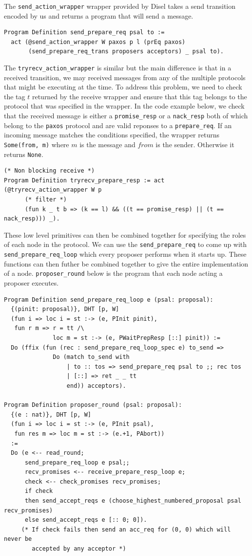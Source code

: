 The \texttt{send\_action\_wrapper} wrapper provided by Disel takes a send transition encoded
by us and returns a program that will send a message.
\begin{lstlisting}
Program Definition send_prepare_req psal to :=
  act (@send_action_wrapper W paxos p l (prEq paxos)
       (send_prepare_req_trans proposers acceptors) _ psal to).
\end{lstlisting}

The \texttt{tryrecv\_action\_wrapper} is similar but the main difference is that in
a received transition, we may received messages from any of the multiple protocols
that might be executing at the time. To address this problem, we need to check the
tag $t$ returned by the receive wrapper and ensure that this tag belongs to the
protocol that was specified in the wrapper. In the code example below, we check
that the received message is either a \texttt{promise\_resp} or a \texttt{nack\_resp}
both of which belong to the \texttt{paxos} protocol and are valid reponses to a
\texttt{prepare\_req}.
If an incoming message matches the conditions specified, the wrapper returns
\texttt{Some(from, m)} where $m$ is the message and $from$ is the sender. Otherwise
it returns \texttt{None}.

\begin{lstlisting}
(* Non blocking receive *)
Program Definition tryrecv_prepare_resp := act (@tryrecv_action_wrapper W p
      (* filter *)
      (fun k _ t b => (k == l) && ((t == promise_resp) || (t == nack_resp))) _).
\end{lstlisting}

These low level primitives can then be combined together for specifying the roles
of each node in the protocol. We can use the \texttt{send\_prepare\_req} to
come up with \texttt{send\_prepare\_req\_loop} which every proposer performs when
it starts up. These functions can then futher be combined together to give the
entire implementation of a node. \texttt{proposer\_round} below is the program
that each node acting a proposer executes.

\begin{lstlisting}
Program Definition send_prepare_req_loop e (psal: proposal):
  {(pinit: proposal)}, DHT [p, W]
  (fun i => loc i = st :-> (e, PInit pinit),
   fun r m => r = tt /\
              loc m = st :-> (e, PWaitPrepResp [::] pinit)) :=
  Do (ffix (fun (rec : send_prepare_req_loop_spec e) to_send =>
              Do (match to_send with
                  | to :: tos => send_prepare_req psal to ;; rec tos
                  | [::] => ret _ _ tt
                  end)) acceptors).

Program Definition proposer_round (psal: proposal):
  {(e : nat)}, DHT [p, W]
  (fun i => loc i = st :-> (e, PInit psal),
   fun res m => loc m = st :-> (e.+1, PAbort))
  :=
  Do (e <-- read_round;
      send_prepare_req_loop e psal;;
      recv_promises <-- receive_prepare_resp_loop e;
      check <-- check_promises recv_promises;
      if check
      then send_accept_reqs e (choose_highest_numbered_proposal psal recv_promises)
      else send_accept_reqs e [:: 0; 0]).
     (* If check fails then send an acc_req for (0, 0) which will never be
        accepted by any acceptor *)
\end{lstlisting}

